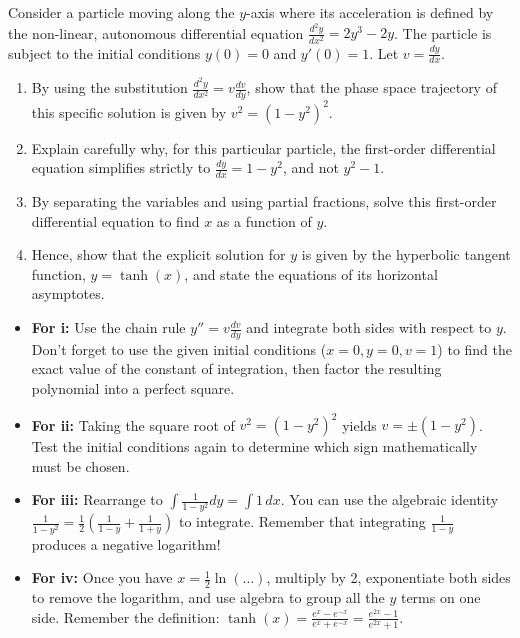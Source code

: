 \begin{problem}
Consider a particle moving along the $y$-axis where its acceleration is defined by the non-linear, autonomous differential equation $\frac{d^2y}{dx^2} = 2y^3 - 2y$. 
The particle is subject to the initial conditions $y(0) = 0$ and $y'(0) = 1$. Let $v = \frac{dy}{dx}$.

\begin{enumerate}
    \item[\textbf{i}] By using the substitution $\frac{d^2y}{dx^2} = v \frac{dv}{dy}$, show that the phase space trajectory of this specific solution is given by $v^2 = (1-y^2)^2$.
    \item[\textbf{ii}] Explain carefully why, for this particular particle, the first-order differential equation simplifies strictly to $\frac{dy}{dx} = 1 - y^2$, and not $y^2 - 1$.
    \item[\textbf{iii}] By separating the variables and using partial fractions, solve this first-order differential equation to find $x$ as a function of $y$.
    \item[\textbf{iv}] Hence, show that the explicit solution for $y$ is given by the hyperbolic tangent function, $y = \tanh(x)$, and state the equations of its horizontal asymptotes.
\end{enumerate}
\end{problem}

\begin{hint}
\begin{itemize}
    \item \textbf{For i:} Use the chain rule $y'' = v \frac{dv}{dy}$ and integrate both sides with respect to $y$. Don't forget to use the given initial conditions ($x=0, y=0, v=1$) to find the exact value of the constant of integration, then factor the resulting polynomial into a perfect square.
    \item \textbf{For ii:} Taking the square root of $v^2 = (1-y^2)^2$ yields $v = \pm(1-y^2)$. Test the initial conditions again to determine which sign mathematically must be chosen.
    \item \textbf{For iii:} Rearrange to $\int \frac{1}{1-y^2} dy = \int 1 \, dx$. You can use the algebraic identity $\frac{1}{1-y^2} = \frac{1}{2}\left(\frac{1}{1-y} + \frac{1}{1+y}\right)$ to integrate. Remember that integrating $\frac{1}{1-y}$ produces a negative logarithm!
    \item \textbf{For iv:} Once you have $x = \frac{1}{2}\ln(\dots)$, multiply by 2, exponentiate both sides to remove the logarithm, and use algebra to group all the $y$ terms on one side. Remember the definition: $\tanh(x) = \frac{e^x-e^{-x}}{e^x+e^{-x}} = \frac{e^{2x}-1}{e^{2x}+1}$.
\end{itemize}
\end{hint}

